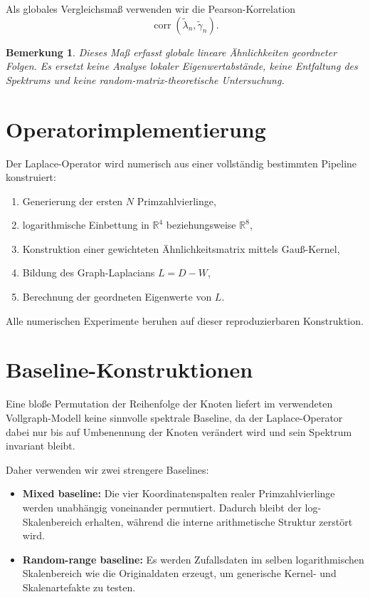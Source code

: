 \documentclass[11pt,a4paper,draft]{article}
\newtheorem{bemerkung}[definition]{Bemerkung}
\newcommand{\R}{\mathbb{R}}
\newcommand{\corr}{\operatorname{corr}}
\begin{document}
	Als globales Vergleichsmaß verwenden wir die Pearson-Korrelation
	\[
	\corr(\widetilde{\lambda}_n,\widetilde{\gamma}_n).
	\]
	
	\begin{bemerkung}
		Dieses Maß erfasst globale lineare Ähnlichkeiten geordneter Folgen. Es ersetzt keine Analyse lokaler Eigenwertabstände, keine Entfaltung des Spektrums und keine random-matrix-theoretische Untersuchung.
	\end{bemerkung}
	
	\section{Operatorimplementierung}
	
	Der Laplace-Operator wird numerisch aus einer vollständig bestimmten Pipeline konstruiert:
	\begin{enumerate}
		\item Generierung der ersten \(N\) Primzahlvierlinge,
		\item logarithmische Einbettung in \(\R^4\) beziehungsweise \(\R^8\),
		\item Konstruktion einer gewichteten Ähnlichkeitsmatrix mittels Gauß-Kernel,
		\item Bildung des Graph-Laplacians \(L=D-W\),
		\item Berechnung der geordneten Eigenwerte von \(L\).
	\end{enumerate}
	
	Alle numerischen Experimente beruhen auf dieser reproduzierbaren Konstruktion.
	
	\section{Baseline-Konstruktionen}
	
	Eine bloße Permutation der Reihenfolge der Knoten liefert im verwendeten Vollgraph-Modell keine sinnvolle spektrale Baseline, da der Laplace-Operator dabei nur bis auf Umbenennung der Knoten verändert wird und sein Spektrum invariant bleibt.
	
	Daher verwenden wir zwei strengere Baselines:
	\begin{itemize}
		\item \textbf{Mixed baseline:} Die vier Koordinatenspalten realer Primzahlvierlinge werden unabhängig voneinander permutiert. Dadurch bleibt der log-Skalenbereich erhalten, während die interne arithmetische Struktur zerstört wird.
		\item \textbf{Random-range baseline:} Es werden Zufallsdaten im selben logarithmischen Skalenbereich wie die Originaldaten erzeugt, um generische Kernel- und Skalenartefakte zu testen.
	\end{itemize}
	
\end{document}
